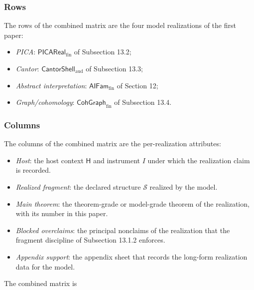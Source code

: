 \documentclass[11pt]{article}
\providecommand{\tightlist}{}
\theoremstyle{definition}
\begin{document}
\subsubsection{Rows}

The rows of the combined matrix are the four model realizations of the first paper:

\begin{itemize}
\tightlist
\item
  \emph{PICA}: \(\mathsf{PICAReal}_{\mathrm{fin}}\) of Subsection 13.2;
\item
  \emph{Cantor}: \(\mathsf{CantorShell}_{\mathrm{aud}}\) of Subsection 13.3;
\item
  \emph{Abstract interpretation}: \(\mathsf{AIFam}_{\mathrm{fin}}\) of Section 12;
\item
  \emph{Graph/cohomology}: \(\mathsf{CohGraph}_{\mathrm{fin}}\) of Subsection 13.4.
\end{itemize}

\subsubsection{Columns}

The columns of the combined matrix are the per-realization attributes:

\begin{itemize}
\tightlist
\item
  \emph{Host}: the host context \(\mathsf H\) and instrument \(I\) under which the realization claim is recorded.
\item
  \emph{Realized fragment}: the declared structure \(\mathcal S\) realized by the model.
\item
  \emph{Main theorem}: the theorem-grade or model-grade theorem of the realization, with its number in this paper.
\item
  \emph{Blocked overclaims}: the principal nonclaims of the realization that the fragment discipline of Subsection 13.1.2 enforces.
\item
  \emph{Appendix support}: the appendix sheet that records the long-form realization data for the model.
\end{itemize}

The combined matrix is
\end{document}
